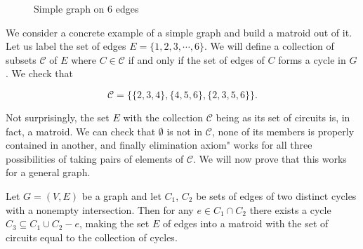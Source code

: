 \begin{figure}[H]
\centering

\caption{Simple graph on 6 edges}
  \label{simp}

\end{figure}

We consider a concrete example of a simple graph and build a matroid out of it. Let us label the set of edges $E = \{1, 2, 3, \cdots, 6\}$. We will define a collection of subsets $\mathcal{C}$ of $E$ where $C \in \mathcal{C}$ if and only if the set of edges of $C$ forms a cycle in $G$. We check that 

    $$\mathcal{C} = \{\{2,3,4\}, \{4,5,6\}, \{2, 3, 5, 6\}\}.$$

Not surprisingly, the set $E$ with the collection $\mathcal{C}$ being as its set of circuits is, in fact, a matroid. We can check that $\emptyset$ is not in $\mathcal{C}$, none of its members is properly contained in another, and finally \circuit elimination axiom" works for all three possibilities of taking pairs of elements of $\mathcal{C}$. We will now prove that this works for a general graph.

\begin{theorem}
Let $G = (V, E)$ be a graph and let $C_1$, $C_2$ be sets of edges of two distinct cycles with a nonempty intersection. Then for any $e \in C_1 \cap C_2$ there exists a cycle $C_3 \subseteq C_1 \cup C_2 -e$, making the set $E$ of edges into a matroid with the set of circuits equal to the collection of cycles.
\end{theorem}

